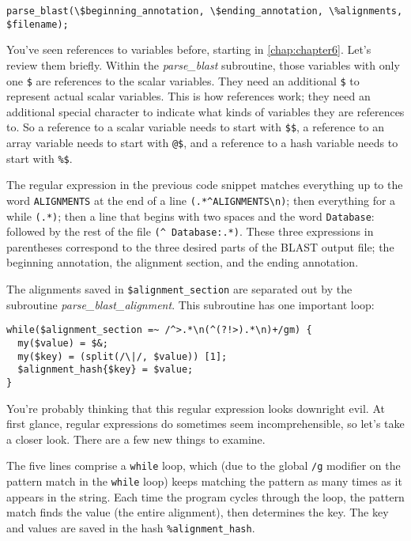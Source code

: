 \begin{lstlisting}
parse_blast(\$beginning_annotation, \$ending_annotation, \%alignments, $filename);
\end{lstlisting}

You've seen references to variables before, starting in \autoref{chap:chapter6}. Let's review them briefly. Within the \textit{parse\_blast} subroutine, those variables with only one \verb|$| are references to the scalar variables. They need an additional \verb|$| to represent actual scalar variables. This is how references work; they need an additional special character to indicate what kinds of variables they are references to. So a reference to a scalar variable needs to start with \verb|$$|, a reference to an array variable needs to start with \verb|@$|, and a reference to a hash variable needs to start with \verb|%$|. 

The regular expression in the previous code snippet matches everything up to the word \verb|ALIGNMENTS| at the end of a line \verb|(.*^ALIGNMENTS\n)|; then everything for a while \verb|(.*)|; then a line that begins with two spaces and the word \verb|Database|: followed by the rest of the file \verb|(^ Database:.*)|. These three expressions in parentheses correspond to the three desired parts of the BLAST output file; the beginning annotation, the alignment section, and the ending annotation.

The alignments saved in \verb|$alignment_section| are separated out by the subroutine \textit{parse\_blast\_alignment}. This subroutine has one important loop: 

\begin{lstlisting}
while($alignment_section =~ /^>.*\n(^(?!>).*\n)+/gm) {
  my($value) = $&;
  my($key) = (split(/\|/, $value)) [1];
  $alignment_hash{$key} = $value;
}
\end{lstlisting}

You're probably thinking that this regular expression looks downright evil. At first glance, regular expressions do sometimes seem incomprehensible, so let's take a closer look. There are a few new things to examine.

The five lines comprise a \verb|while| loop, which (due to the global \verb|/g| modifier on the pattern match in the \verb|while| loop) keeps matching the pattern as many times as it appears in the string. Each time the program cycles through the loop, the pattern match finds the value (the entire alignment), then determines the key. The key and values are saved in the hash \verb|%alignment_hash|.

